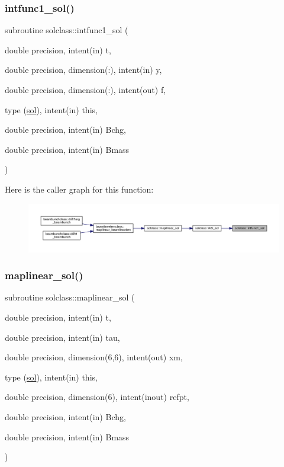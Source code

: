 \subsubsection{\texorpdfstring{intfunc1\_sol()}{intfunc1\_sol()}}
{\footnotesize\ttfamily subroutine solclass\+::intfunc1\+\_\+sol (\begin{DoxyParamCaption}\item[{double precision, intent(in)}]{t,  }\item[{double precision, dimension(\+:), intent(in)}]{y,  }\item[{double precision, dimension(\+:), intent(out)}]{f,  }\item[{type (\mbox{\hyperlink{namespacesolclass_structsolclass_1_1sol}{sol}}), intent(in)}]{this,  }\item[{double precision, intent(in)}]{Bchg,  }\item[{double precision, intent(in)}]{Bmass }\end{DoxyParamCaption})}

Here is the caller graph for this function\+:\nopagebreak
\begin{figure}[H]
\begin{center}
\leavevmode
\includegraphics[width=350pt]{namespacesolclass_a195ad6d94c20d0ac4d6ed1c8063a8a3b_icgraph}
\end{center}
\end{figure}
\mbox{\label{namespacesolclass_ac1f4d73224d7585c1be1bb6f24f125df}} 
\subsubsection{\texorpdfstring{maplinear\_sol()}{maplinear\_sol()}}
{\footnotesize\ttfamily subroutine solclass\+::maplinear\+\_\+sol (\begin{DoxyParamCaption}\item[{double precision, intent(in)}]{t,  }\item[{double precision, intent(in)}]{tau,  }\item[{double precision, dimension(6,6), intent(out)}]{xm,  }\item[{type (\mbox{\hyperlink{namespacesolclass_structsolclass_1_1sol}{sol}}), intent(in)}]{this,  }\item[{double precision, dimension(6), intent(inout)}]{refpt,  }\item[{double precision, intent(in)}]{Bchg,  }\item[{double precision, intent(in)}]{Bmass }\end{DoxyParamCaption})}


